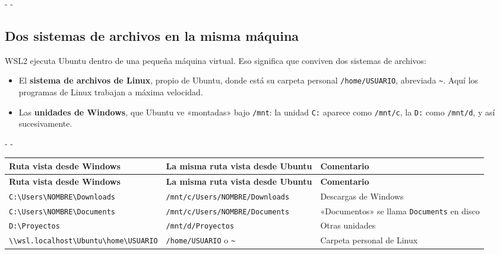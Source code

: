 \documentclass[11pt,a4paper]{article}
\makeatletter
\newcommand{\necesitaespacio}[1]{\par\penalty-100\begingroup
	\setlength{\dimen@}{#1}\dimen@ii\pagegoal\advance\dimen@ii-\pagetotal
	\ifdim\dimen@>\dimen@ii\ifdim\dimen@ii>\z@\vfil\fi\penalty-\@M\fi\endgroup}
\newcommand{\arch}[1]{\texttt{\textcolor{colarch}{#1}}}    %
\newcommand{\cab}[1]{\textbf{#1}}
\newcommand{\bs}{\textbackslash{}}    %
\newcommand{\tl}{\textasciitilde{}}  %
\makeatother
\begin{document}
	\necesitaespacio{8\baselineskip}
	\subsection{Dos sistemas de archivos en la misma máquina}
	
	WSL2 ejecuta Ubuntu dentro de una pequeña máquina virtual. Eso significa que conviven dos sistemas de archivos:
	
	\begin{itemize}
		\item El \textbf{sistema de archivos de Linux}, propio de Ubuntu, donde está su carpeta personal \arch{/home/USUARIO}, abreviada \arch{\tl}. Aquí los programas de Linux trabajan a máxima velocidad.
		\item Las \textbf{unidades de Windows}, que Ubuntu ve «montadas» bajo \arch{/mnt}: la unidad \arch{C:} aparece como \arch{/mnt/c}, la \arch{D:} como \arch{/mnt/d}, y así sucesivamente.
	\end{itemize}
	
	\begingroup\small
	\necesitaespacio{13\baselineskip}
	\begin{longtable}{L{5.16cm}L{5.4cm}L{4.5cm}}
		\toprule{}\cab{Ruta vista desde Windows} & \cab{La misma ruta vista desde Ubuntu} & \cab{Comentario}\\\midrule
		\endfirsthead
		\toprule{}\cab{Ruta vista desde Windows} & \cab{La misma ruta vista desde Ubuntu} & \cab{Comentario}\\\midrule
		\endhead
		\bottomrule
		\endfoot
		\arch{C:\bs{}\allowbreak{}Users\bs{}\allowbreak{}NOMBRE\bs{}\allowbreak{}Downloads} & \arch{/\allowbreak{}mnt/\allowbreak{}c/\allowbreak{}Users/\allowbreak{}NOMBRE/\allowbreak{}Downloads} & Descargas de Windows\\*
		\arch{C:\bs{}\allowbreak{}Users\bs{}\allowbreak{}NOMBRE\bs{}\allowbreak{}Documents} & \arch{/\allowbreak{}mnt/\allowbreak{}c/\allowbreak{}Users/\allowbreak{}NOMBRE/\allowbreak{}Documents} & «Documentos» se llama \arch{Documents} en disco\\
		\arch{D:\bs{}Proyectos} & \arch{/\allowbreak{}mnt/\allowbreak{}d/\allowbreak{}Proyectos} & Otras unidades\\*
		\arch{\bs\bs{}\allowbreak{}wsl.localhost\bs{}\allowbreak{}Ubuntu\bs{}\allowbreak{}home\bs{}\allowbreak{}USUARIO} & \arch{/home/USUARIO} o \arch{\tl} & Carpeta personal de Linux\\
	\end{longtable}
	\endgroup
	
\end{document}
